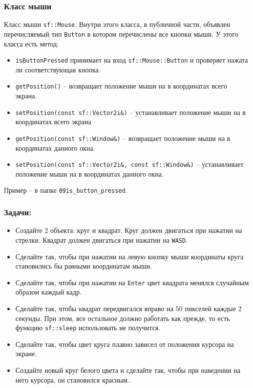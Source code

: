 \documentclass{article}
\begin{document}
\subsubsection*{Класс мыши}
Класс мыши \texttt{sf::Mouse}. Внутри этого класса, в публичной части, объявлен перечисляемый тип \texttt{Button} в котором перечислены все кнопки мыши.
У этого класса есть метод:
\begin{itemize}
\item \texttt{isButtonPressed} принимает на вход \texttt{sf::Mouse::Button} и проверяет нажата ли соответствующая кнопка.
\item \texttt{getPosition()} -- возвращает положение мыши на в координатах всего экрана.
\item \texttt{setPosition(const sf::Vector2i\&)} --  устанавливает положение мыши на в координатах всего экрана
\item \texttt{getPosition(const sf::Window\&)} -- возвращает положение мыши на в координатах данного окна.
\item \texttt{setPosition(const sf::Vector2i\&, const sf::Window\&)} --  устанавливает положение мыши на в координатах данного окна.
\end{itemize}
Пример -- в папке \texttt{09is\_button\_pressed}.

\subsubsection*{Задачи:}
\begin{itemize}
\item Создайте 2 объекта: круг и квадрат. Круг должен двигаться при нажатии на стрелки. Квадрат должен двигаться при нажатии на \texttt{WASD}.
\item Сделайте так, чтобы при нажатии на левую кнопку мыши координаты круга становились бы равными координатам мыши.
\item Сделайте так, чтобы при нажатии на \texttt{Enter} цвет квадрата менялся случайным образом каждый кадр.
\item Сделайте так, чтобы квадрат передвигался вправо на 50 пикселей каждые 2 секунды. При этом, все остальное должно работать как прежде, то есть функцию \texttt{sf::sleep} использовать не получится.
\item Сделайте так, чтобы цвет круга плавно зависел от положения курсора на экране.

\item Создайте новый круг белого цвета и сделайте так, чтобы при наведении на него курсора, он становился красным.
\end{itemize}
\end{document}
